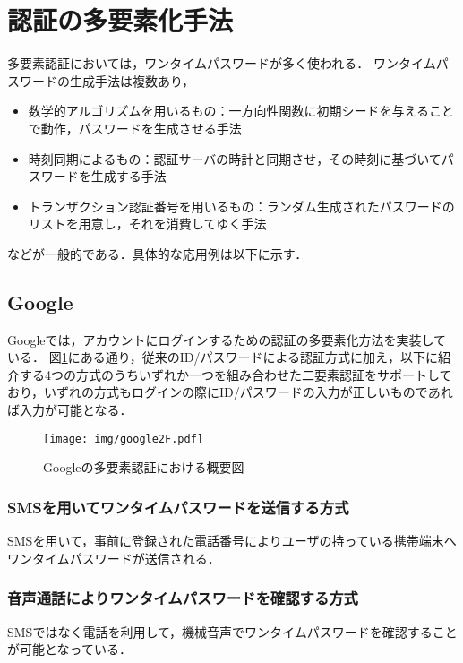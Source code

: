 \section{認証の多要素化手法}\label{sec:multifactor}
多要素認証においては，ワンタイムパスワードが多く使われる．
ワンタイムパスワードの生成手法は複数あり，
\begin{itemize}
\item 数学的アルゴリズムを用いるもの：一方向性関数に初期シードを与えることで動作，パスワードを生成させる手法
\item 時刻同期によるもの：認証サーバの時計と同期させ，その時刻に基づいてパスワードを生成する手法
\item トランザクション認証番号を用いるもの：ランダム生成されたパスワードのリストを用意し，それを消費してゆく手法
\end{itemize}
などが一般的である．具体的な応用例は以下に示す．

\subsection{Google}\label{subsec:google2F}
Googleでは，アカウントにログインするための認証の多要素化方法を実装している．
図\ref{fig:google2F}にある通り，従来のID/パスワードによる認証方式に加え，以下に紹介する4つの方式のうちいずれか一つを組み合わせた二要素認証をサポートしており，いずれの方式もログインの際にID/パスワードの入力が正しいものであれば入力が可能となる．

\begin{figure}[ht]
  \begin{center}
    \texttt{[image: img/google2F.pdf]}
  \end{center}
  \caption{Googleの多要素認証における概要図}
  \label{fig:google2F}
\end{figure}

\subsubsection{SMSを用いてワンタイムパスワードを送信する方式}
SMSを用いて，事前に登録された電話番号によりユーザの持っている携帯端末へワンタイムパスワードが送信される．

\subsubsection{音声通話によりワンタイムパスワードを確認する方式}
SMSではなく電話を利用して，機械音声でワンタイムパスワードを確認することが可能となっている．

